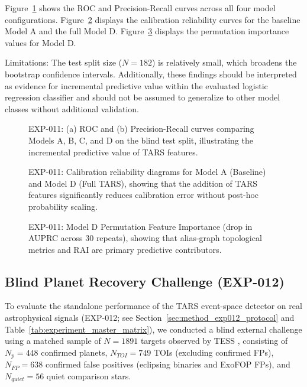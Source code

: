 Figure~\ref{fig:exp011_curves} shows the ROC and Precision-Recall curves across all four model configurations. Figure~\ref{fig:exp011_calibration} displays the calibration reliability curves for the baseline Model A and the full Model D. Figure~\ref{fig:exp011_importance} displays the permutation importance values for Model D.

Limitations: The test split size ($N = 182$) is relatively small, which broadens the bootstrap confidence intervals. Additionally, these findings should be interpreted as evidence for incremental predictive value within the evaluated logistic regression classifier and should not be assumed to generalize to other model classes without additional validation.

\begin{figure}[htbp]
\centering
{}
\caption{EXP-011: (a) ROC and (b) Precision-Recall curves comparing Models A, B, C, and D on the blind test split, illustrating the incremental predictive value of TARS features.}
\label{fig:exp011_curves}
\end{figure}

\begin{figure}[htbp]
\centering
{}
\caption{EXP-011: Calibration reliability diagrams for Model A (Baseline) and Model D (Full TARS), showing that the addition of TARS features significantly reduces calibration error without post-hoc probability scaling.}
\label{fig:exp011_calibration}
\end{figure}

\begin{figure}[htbp]
\centering
{}
\caption{EXP-011: Model D Permutation Feature Importance (drop in AUPRC across 30 repeats), showing that alias-graph topological metrics and RAI are primary predictive contributors.}
\label{fig:exp011_importance}
\end{figure}

\subsection{Blind Planet Recovery Challenge (EXP-012)} \label{sec:results_exp012} \label{sec:exp012}

To evaluate the standalone performance of the TARS event-space detector on real astrophysical signals (EXP-012; see Section~\ref{sec:method_exp012_protocol} and Table~\ref{tab:experiment_master_matrix}), we conducted a blind external challenge using a matched sample of $N = 1891$ targets observed by TESS \citep{Vanderspek2018}, consisting of $N_p = 448$ confirmed planets, $N_{TOI} = 749$ TOIs \citep{Guerrero2021} (excluding confirmed FPs), $N_{FP} = 638$ confirmed false positives (eclipsing binaries and ExoFOP FPs), and $N_{quiet} = 56$ quiet comparison stars. 

